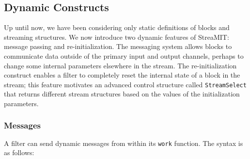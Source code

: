 \documentclass[draft]{article}
\begin{document}
\subsection{Dynamic Constructs}
\protect\label{sec:dynamic}

Up until now, we have been considering only static definitions of
blocks and streaming structures.  We now introduce two dynamic
features of StreaMIT: message passing and re-initialization.  The
messaging system allows blocks to communicate data outside of the
primary input and output channels, perhaps to change some internal
parameters elsewhere in the stream.  The re-initialization construct
enables a filter to completely reset the internal state of a block in
the stream; this feature motivates an advanced control structure
called {\tt StreamSelect} that returns different stream structures
based on the values of the initialization parameters.

\subsubsection{Messages}

A filter can send dynamic messages from within its {\tt work}
function.  The syntax is as follows:
\end{document}
